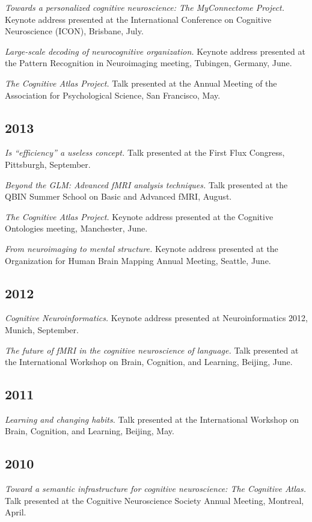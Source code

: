 \documentclass[10pt, letterpaper]{article}
\begin{document}
\textit{Towards a personalized cognitive neuroscience: The MyConnectome Project.} Keynote address presented at the International Conference on Cognitive Neuroscience (ICON), Brisbane, July.

\textit{Large-scale decoding of neurocognitive organization.} Keynote address presented at the Pattern Recognition in Neuroimaging meeting, Tubingen, Germany, June.

\textit{The Cognitive Atlas Project.} Talk presented at the Annual Meeting of the Association for Psychological Science, San Francisco, May.

\subsection*{2013}\textit{Is ``efficiency'' a useless concept.} Talk presented at the First Flux Congress, Pittsburgh, September.

\textit{Beyond the GLM: Advanced fMRI analysis techniques.} Talk presented at the QBIN Summer School on Basic and Advanced fMRI, August.

\textit{The Cognitive Atlas Project.} Keynote address presented at the Cognitive Ontologies meeting, Manchester, June.

\textit{From neuroimaging to mental structure.} Keynote address presented at the Organization for Human Brain Mapping Annual Meeting, Seattle, June.

\subsection*{2012}\textit{Cognitive Neuroinformatics.} Keynote address presented at Neuroinformatics 2012, Munich, September.

\textit{The future of fMRI in the cognitive neuroscience of language.} Talk presented at the International Workshop on Brain, Cognition, and Learning, Beijing, June.

\subsection*{2011}\textit{Learning and changing habits.} Talk presented at the International Workshop on Brain, Cognition, and Learning, Beijing, May.

\subsection*{2010}\textit{Toward a semantic infrastructure for cognitive neuroscience: The Cognitive Atlas.} Talk presented at the Cognitive Neuroscience Society Annual Meeting, Montreal, April.
\end{document}
